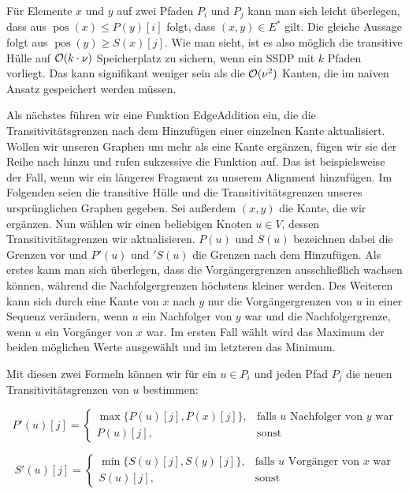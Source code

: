 Für Elemente $x$ und $y$ auf zwei Pfaden $P_i$ und $P_j$ kann man sich leicht überlegen, dass aus $\operatorname{pos}(x) \leq P(y)[i]$ folgt, dass $(x,y)\in E^*$ gilt. Die gleiche Aussage folgt aus $\operatorname{pos}(y) \geq S(x)[j]$. Wie man sieht, ist es also möglich die transitive Hülle auf $\mathcal{O}(k \cdot \nu)$ Speicherplatz zu sichern, wenn ein SSDP mit $k$ Pfaden vorliegt. Das kann signifikant weniger sein als die $\mathcal{O}(\nu^2)$ Kanten, die im naiven Ansatz gespeichert werden müssen.


Als nächstes führen wir eine Funktion \textrm{EdgeAddition} ein, die die Transitivitätsgrenzen nach dem Hinzufügen einer einzelnen Kante aktualisiert. Wollen wir unseren Graphen um mehr als eine Kante ergänzen, fügen wir sie der Reihe nach hinzu und rufen sukzessive die Funktion auf. Das ist beispielsweise der Fall, wenn wir ein längeres Fragment zu unserem Alignment hinzufügen. Im Folgenden seien die transitive Hülle und die Transitivitätsgrenzen unseres ursprünglichen Graphen gegeben. Sei außerdem $(x,y)$ die Kante, die wir ergänzen. Nun wählen wir einen beliebigen Knoten $u \in V$, dessen Transitivitätsgrenzen wir aktualisieren. $P(u)$ und $S(u)$ bezeichnen dabei die Grenzen vor und $P'(u)$ und $'S(u)$ die Grenzen nach dem Hinzufügen. Als erstes kann man sich überlegen, dass die Vorgängergrenzen ausschließlich wachsen können, während die Nachfolgergrenzen höchstens kleiner werden. Des Weiteren kann sich durch eine Kante von $x$ nach $y$ nur die Vorgängergrenzen von $u$ in einer Sequenz verändern, wenn $u$ ein Nachfolger von $y$ war und die Nachfolgergrenze, wenn $u$ ein Vorgänger von $x$ war. Im ersten Fall wählt wird das Maximum der beiden möglichen Werte ausgewählt und im letzteren das Minimum.  

Mit diesen zwei Formeln können wir für ein $u \in P_i$ und jeden Pfad $P_j$ die neuen Transitivitätsgrenzen von $u$ bestimmen:

\begin{equation}
	P'(u)[j] = \begin{cases}
			\max\{P(u)[j], P(x)[j]\}, & \text{falls $u$ Nachfolger von $y$ war} \\
			P(u)[j], & \text{sonst}
		\end{cases}
\end{equation} 

\begin{equation}
	S'(u)[j] = \begin{cases}
			\min\{S(u)[j], S(y)[j]\}, & \text{falls $u$ Vorgänger von $x$ war} \\
			S(u)[j], & \text{sonst}
		\end{cases}
\end{equation}

